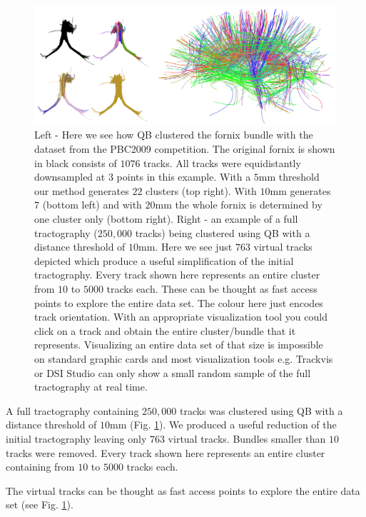 \documentclass[preprint,authoryear,a4paper,10pt,onecolumn]{elsarticle}
\begin{document}
%
\begin{figure}
\begin{centering}
\includegraphics[scale=0.6]{last_figures/LSC_simple}
\par\end{centering}
\caption{Left - Here we see how QB clustered the fornix bundle with the
  dataset from the PBC2009 competition. The original fornix is shown in
  black consists of $1076$ tracks. All tracks were equidistantly
  downsampled at $3$ points in this example. With a $5$mm threshold our
  method generates $22$ clusters (top right). With $10$mm generates $7$
  (bottom left) and with $20$mm the whole fornix is determined by one
  cluster only (bottom right). Right - an example of a full tractography
  ($250,000$ tracks) being clustered using QB with a distance threshold
  of $10$mm. Here we see just $763$ virtual tracks depicted which
  produce a useful simplification of the initial tractography. Every
  track shown here represents an entire cluster from $10$ to $5000$
  tracks each. These can be thought as fast access points to explore the
  entire data set. The colour here just encodes track orientation.  With
  an appropriate visualization tool you could click on a track and
  obtain the entire cluster/bundle that it represents. Visualizing an
  entire data set of that size is impossible on standard graphic cards
  and most visualization tools e.g. Trackvis or DSI Studio can only show
  a small random sample of the full tractography at real time.\label{Flo:QB_fornix}}
\centering{}
\end{figure}

A full tractography containing $250,000$ tracks was clustered using QB
with a distance threshold of $10$mm (Fig. \ref{Flo:QB_fornix}).  We
produced a useful reduction of the initial tractography leaving only
$763$ virtual tracks. Bundles smaller than $10$ tracks were
removed. Every track shown here represents an entire cluster containing
from $10$ to $5000$ tracks each.

The virtual tracks can be thought as fast access points to explore the
entire data set (see Fig. \ref{Flo:QB_fornix}).
\end{document}
